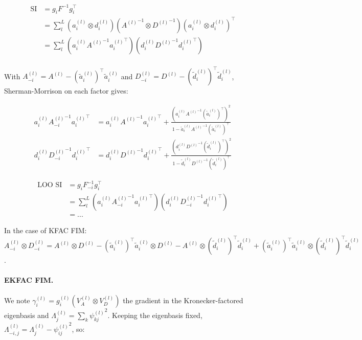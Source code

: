 \documentclass[11pt]{article}
\begin{document}
\begin{align*}
	\text{SI}&=g_i F^{-1}g_i^{\top}\\
	&=\sum_l^L \left(a^{(l)}_i\otimes d^{(l)}_i\right)\left({A^{(l)}}^{-1}\otimes {D^{(l)}}^{-1}\right)\left(a^{(l)}_i\otimes d^{(l)}_i\right)^{\top}\\
	&=\sum_l^L \left(a^{(l)}_i {A^{(l)}}^{-1}{a^{(l)}_i}^{\top}\right)\left(d^{(l)}_i {D^{(l)}}^{-1}{d^{(l)}_i}^{\top}\right)\\
\end{align*}

With $A^{(l)}_{-i}=A^{(l)}-\left(\tilde{a}^{(l)}_i\right)^{\top}\tilde{a}^{(l)}_i$ and $D^{(l)}_{-i}=D^{(l)}-\left(\tilde{d}^{(l)}_i\right)^{\top}\tilde{d}^{(l)}_i$, Sherman-Morrison on each factor gives:

\begin{align*}
	a^{(l)}_i {A^{(l)}_{-i}}^{-1}{a^{(l)}_i}^{\top}&=a^{(l)}_i {A^{(l)}}^{-1}{a^{(l)}_i}^{\top}+\frac{\left(a^{(l)}_i {A^{(l)}}^{-1}\left(\tilde{a}^{(l)}_i\right)^{\top}\right)^2}{1-\tilde{a}^{(l)}_i {A^{(l)}}^{-1}\left(\tilde{a}^{(l)}_i\right)^{\top}}\\
	d^{(l)}_i {D^{(l)}_{-i}}^{-1}{d^{(l)}_i}^{\top}&=d^{(l)}_i {D^{(l)}}^{-1}{d^{(l)}_i}^{\top}+\frac{\left(d^{(l)}_i {D^{(l)}}^{-1}\left(\tilde{d}^{(l)}_i\right)^{\top}\right)^2}{1-\tilde{d}^{(l)}_i {D^{(l)}}^{-1}\left(\tilde{d}^{(l)}_i\right)^{\top}}
\end{align*}

\begin{align*}
	\text{LOO SI}&=g_i F^{-1}_{-i}g_i^{\top}\\
	&=\sum_l^L \left(a^{(l)}_i {A^{(l)}_{-i}}^{-1}{a^{(l)}_i}^{\top}\right)\left(d^{(l)}_i {D^{(l)}_{-i}}^{-1}{d^{(l)}_i}^{\top}\right)\\
	&= ...
\end{align*}

In the case of KFAC FIM: $A^{(l)}_{-i}\otimes D^{(l)}_{-i}=A^{(l)}\otimes D^{(l)}-\left(\tilde{a}^{(l)}_i\right)^{\top}\tilde{a}^{(l)}_i\otimes D^{(l)}-A^{(l)}\otimes\left(\tilde{d}^{(l)}_i\right)^{\top}\tilde{d}^{(l)}_i+\left(\tilde{a}^{(l)}_i\right)^{\top}\tilde{a}^{(l)}_i\otimes\left(\tilde{d}^{(l)}_i\right)^{\top}\tilde{d}^{(l)}_i$.

\paragraph{EKFAC FIM.}
We note $\gamma^{(l)}_i=g^{(l)}_i\left(V^{(l)}_A\otimes V^{(l)}_D\right)$ the gradient in the Kronecker-factored eigenbasis and $\Lambda^{(l)}_j=\sum_k{\psi^{(l)}_{kj}}^2$. Keeping the eigenbasis fixed, $\Lambda^{(l)}_{-i,j}=\Lambda^{(l)}_j-{\psi^{(l)}_{ij}}^2$, so:
\end{document}

